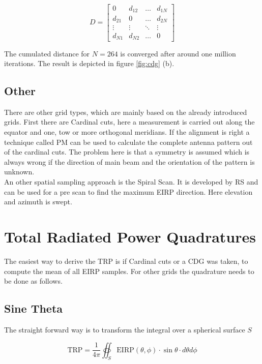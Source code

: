 \begin{equation}
D = \begin{bmatrix}
 0 & d_{12} & \dots & d_{1N}\\
 d_{21} & 0 & \dots & d_{2N}\\
 \vdots & \vdots & \ddots & \vdots\\
 d_{N1} & d_{N2} & \dots & 0
\end{bmatrix}
\end{equation}

The cumulated distance for $N = 264$ is converged after around one million iterations. The result is depicted in figure \ref{fig:cdg} (b).

\subsection{Other}

There are other grid types, which are mainly based on the already introduced grids. First there are Cardinal cuts, here a measurement is carried out along the equator and one, tow or more orthogonal meridians. If the alignment is right a technique called \acf{PM} can be used to calculate the complete antenna pattern out of the cardinal cuts. The problem here is that a symmetry is assumed which is always wrong if the direction of main beam and the orientation of the pattern is unknown. \cite{2018arXiv180310993F}\\
An other spatial sampling approach is the Spiral Scan. It is developed by \ac{RS} and can be used for a pre scan to find the maximum \ac{EIRP} direction. Here elevation and azimuth is swept. \cite{ctiaat}

\section{Total Radiated Power Quadratures}
\label{sec:quadrature}

The easiest way to derive the \ac{TRP} is if Cardinal cuts or a \ac{CDG} was taken, to compute the mean of all \ac{EIRP} samples. For other grids the quadrature needs to be done as follows. \cite{trp}

\subsection{Sine Theta}

The straight forward way is to transform the integral over a spherical surface $S$

\begin{equation}
\text{TRP} = \frac{1}{4\pi}  \oiint_S \text{EIRP}\left(\theta,\phi\right)\cdot\sin\theta\cdot d\theta d\phi
\label{eq:trpint}
\end{equation}

